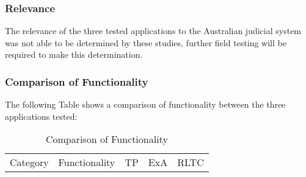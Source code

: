 \subsubsection{Relevance}
The relevance of the three tested applications to the Australian judicial system was not able to be determined by these studies, further field testing will be required to make this determination.
\newpage

\subsubsection{Comparison of Functionality}
The following Table shows a comparison of functionality between the three applications tested: 

\begin{center}
\begin{table}[htbp]
\label{tab:ComparisonOfFunctionality}    
\caption{Comparison of Functionality}

\small
\centering

\singlespace

\begin{tabular}{|l| c|| c| c| c |} 
\hline
\rowcolor{lightgrey} Category & Functionality & TP & ExA & RLTC \\  


\end{tabular}
\end{table}
\end{center}
